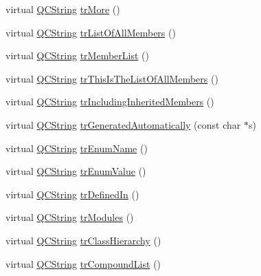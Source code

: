 \begin{DoxyCompactItemize}
\item 
virtual \mbox{\hyperlink{class_q_c_string}{Q\+C\+String}} \mbox{\hyperlink{class_translator_vietnamese_abd0466ab588941eab92359540e5b1af9}{tr\+More}} ()
\item 
virtual \mbox{\hyperlink{class_q_c_string}{Q\+C\+String}} \mbox{\hyperlink{class_translator_vietnamese_a4d5ed439b3d9a0b7b9c7ec0da45d8a45}{tr\+List\+Of\+All\+Members}} ()
\item 
virtual \mbox{\hyperlink{class_q_c_string}{Q\+C\+String}} \mbox{\hyperlink{class_translator_vietnamese_a66968ded6a055c810008d50dc3800409}{tr\+Member\+List}} ()
\item 
virtual \mbox{\hyperlink{class_q_c_string}{Q\+C\+String}} \mbox{\hyperlink{class_translator_vietnamese_a3d636a45afbf510a93b5c0874039d3cf}{tr\+This\+Is\+The\+List\+Of\+All\+Members}} ()
\item 
virtual \mbox{\hyperlink{class_q_c_string}{Q\+C\+String}} \mbox{\hyperlink{class_translator_vietnamese_a19ec4a9a51d691a2bd19edf770b6d2b4}{tr\+Including\+Inherited\+Members}} ()
\item 
virtual \mbox{\hyperlink{class_q_c_string}{Q\+C\+String}} \mbox{\hyperlink{class_translator_vietnamese_af9dd0be1f90f275d0347e0908c746fd5}{tr\+Generated\+Automatically}} (const char $\ast$s)
\item 
virtual \mbox{\hyperlink{class_q_c_string}{Q\+C\+String}} \mbox{\hyperlink{class_translator_vietnamese_a526b3dd360fb83732c9f697ca7e2fd6c}{tr\+Enum\+Name}} ()
\item 
virtual \mbox{\hyperlink{class_q_c_string}{Q\+C\+String}} \mbox{\hyperlink{class_translator_vietnamese_aebde5a5e7e5a8e2bdcedd16aa84b104b}{tr\+Enum\+Value}} ()
\item 
virtual \mbox{\hyperlink{class_q_c_string}{Q\+C\+String}} \mbox{\hyperlink{class_translator_vietnamese_a78229e2e7d5f5e24fba04323160334af}{tr\+Defined\+In}} ()
\item 
virtual \mbox{\hyperlink{class_q_c_string}{Q\+C\+String}} \mbox{\hyperlink{class_translator_vietnamese_a781ee616acb6a6f5979f2652dec7342c}{tr\+Modules}} ()
\item 
virtual \mbox{\hyperlink{class_q_c_string}{Q\+C\+String}} \mbox{\hyperlink{class_translator_vietnamese_a119627f8b75b362852ba560671301ecc}{tr\+Class\+Hierarchy}} ()
\item 
virtual \mbox{\hyperlink{class_q_c_string}{Q\+C\+String}} \mbox{\hyperlink{class_translator_vietnamese_a712cbff64ed48eac757f553af0aef104}{tr\+Compound\+List}} ()
\item 

\end{DoxyCompactItemize}
